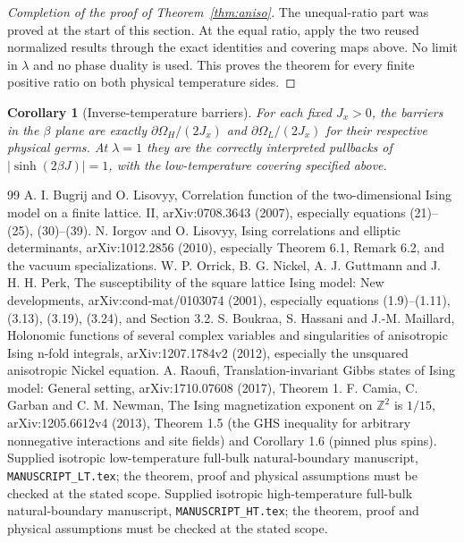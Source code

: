 \documentclass[11pt]{article}
\numberwithin{equation}{section}
\newtheorem{corollary}[theorem]{Corollary}
\theoremstyle{definition}
\newcommand{\OH}{\Omega_H}
\newcommand{\OL}{\Omega_L}
\begin{document}
\begin{proof}[Completion of the proof of Theorem~\ref{thm:aniso}]
The unequal-ratio part was proved at the start of this section. At the equal ratio,
apply the two reused normalized results through the exact identities
and covering maps above. No limit in $\lambda$ and no phase duality
is used. This proves the theorem for every finite positive ratio on
both physical temperature sides.
\end{proof}

\begin{corollary}[Inverse-temperature barriers]\label{cor:alllambda}
For each fixed $J_x>0$, the barriers in the $\beta$ plane are exactly
$\partial\OH/(2J_x)$ and $\partial\OL/(2J_x)$ for their respective
physical germs. At $\lambda=1$ they are the correctly interpreted
pullbacks of $|\sinh(2\beta J)|=1$, with the low-temperature covering
specified above.
\end{corollary}

\begin{thebibliography}{99}
 A. I. Bugrij and O. Lisovyy, Correlation function of the two-dimensional
Ising model on a finite lattice. II, arXiv:0708.3643 (2007), especially
equations (21)--(25), (30)--(39).
 N. Iorgov and O. Lisovyy, Ising correlations and elliptic determinants,
arXiv:1012.2856 (2010), especially Theorem 6.1, Remark 6.2,
and the vacuum specializations.
 W. P. Orrick, B. G. Nickel, A. J. Guttmann and J. H. H. Perk,
The susceptibility of the square lattice Ising model: New developments,
arXiv:cond-mat/0103074 (2001), especially equations (1.9)--(1.11),
(3.13), (3.19), (3.24), and Section 3.2.
 S. Boukraa, S. Hassani and J.-M. Maillard,
Holonomic functions of several complex variables and singularities of
anisotropic Ising n-fold integrals, arXiv:1207.1784v2 (2012),
especially the unsquared anisotropic Nickel equation.
 A. Raoufi, Translation-invariant Gibbs states of Ising model:
General setting, arXiv:1710.07608 (2017), Theorem 1.
 F. Camia, C. Garban and C. M. Newman, The Ising magnetization
exponent on $\mathbb Z^2$ is $1/15$, arXiv:1205.6612v4 (2013),
Theorem 1.5 (the GHS inequality for arbitrary nonnegative interactions
and site fields) and Corollary 1.6 (pinned plus spins).
 Supplied isotropic low-temperature full-bulk
natural-boundary manuscript, \texttt{MANUSCRIPT\_LT.tex}; the theorem,
proof and physical assumptions must be checked at the stated scope.
 Supplied isotropic high-temperature full-bulk
natural-boundary manuscript, \texttt{MANUSCRIPT\_HT.tex}; the theorem,
proof and physical assumptions must be checked at the stated scope.
\end{thebibliography}
\end{document}
